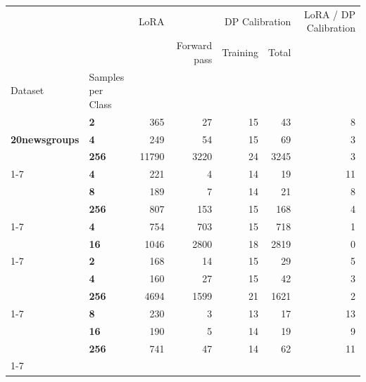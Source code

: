 \begin{tabular}{llrrrrr}
\toprule
 &  & LoRA & \multicolumn{3}{r}{DP Calibration} & LoRA / DP Calibration \\
 &  &  & Forward pass & Training & Total &  \\
Dataset & Samples
per
Class &  &  &  &  &  \\
\midrule
\multirow[t]{3}{*}{\textbf{20newsgroups}} & \textbf{2} & 365 & 27 & 15 & 43 & 8 \\
\textbf{} & \textbf{4} & 249 & 54 & 15 & 69 & 3 \\
\textbf{} & \textbf{256} & 11790 & 3220 & 24 & 3245 & 3 \\
\cline{1-7}
\multirow[t]{3}{*}{\textbf{agnews}} & \textbf{4} & 221 & 4 & 14 & 19 & 11 \\
\textbf{} & \textbf{8} & 189 & 7 & 14 & 21 & 8 \\
\textbf{} & \textbf{256} & 807 & 153 & 15 & 168 & 4 \\
\cline{1-7}
\multirow[t]{2}{*}{\textbf{banking77}} & \textbf{4} & 754 & 703 & 15 & 718 & 1 \\
\textbf{} & \textbf{16} & 1046 & 2800 & 18 & 2819 & 0 \\
\cline{1-7}
\multirow[t]{3}{*}{\textbf{dbpedia}} & \textbf{2} & 168 & 14 & 15 & 29 & 5 \\
\textbf{} & \textbf{4} & 160 & 27 & 15 & 42 & 3 \\
\textbf{} & \textbf{256} & 4694 & 1599 & 21 & 1621 & 2 \\
\cline{1-7}
\multirow[t]{3}{*}{\textbf{sst2}} & \textbf{8} & 230 & 3 & 13 & 17 & 13 \\
\textbf{} & \textbf{16} & 190 & 5 & 14 & 19 & 9 \\
\textbf{} & \textbf{256} & 741 & 47 & 14 & 62 & 11 \\
\cline{1-7}
\bottomrule
\end{tabular}
